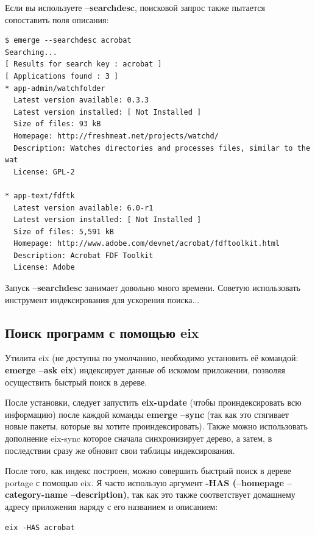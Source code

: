 \documentclass[10pt]{book}
\begin{document}
Если вы используете \textbf{--searchdesc}, поисковой запрос также пытается сопоставить поля описания:
\begin{tcolorbox}
\begin{lstlisting}
$ emerge --searchdesc acrobat
Searching...
[ Results for search key : acrobat ]
[ Applications found : 3 ]
* app-admin/watchfolder
  Latest version available: 0.3.3
  Latest version installed: [ Not Installed ]
  Size of files: 93 kB
  Homepage: http://freshmeat.net/projects/watchd/
  Description: Watches directories and processes files, similar to the wat
  License: GPL-2

* app-text/fdftk
  Latest version available: 6.0-r1
  Latest version installed: [ Not Installed ]
  Size of files: 5,591 kB
  Homepage: http://www.adobe.com/devnet/acrobat/fdftoolkit.html
  Description: Acrobat FDF Toolkit
  License: Adobe
\end{lstlisting}
\end{tcolorbox}

Запуск \textbf{--searchdesc} занимает довольно много времени. Советую использовать инструмент индексирования для ускорения поиска...

\subsection{Поиск программ с помощью eix}

Утилита eix (не доступна по умолчанию, необходимо установить её командой: \textbf{ emerge --ask eix}) индексирует данные об искомом приложении, позволяя осуществить быстрый поиск в дереве.

После установки, следует запустить \textbf{ eix-update} (чтобы проиндексировать всю информацию) после каждой команды \textbf{emerge --sync} (так как это стягивает новые пакеты, которые вы хотите проиндексировать). Также можно использовать дополнение  eix-sync которое сначала синхронизирует дерево, а затем, в последствии сразу же обновит свои таблицы индексирования.

После того, как индекс построен, можно совершить быстрый поиск в дереве portage с помощью eix. Я часто использую  аргумент \textbf{-HAS (--homepage --category-name --description)}, так как это также соответствует домашнему адресу приложения наряду с его названием и описанием:

\begin{tcolorbox}
\begin{lstlisting}
eix -HAS acrobat
\end{lstlisting}
\end{tcolorbox}
\end{document}
